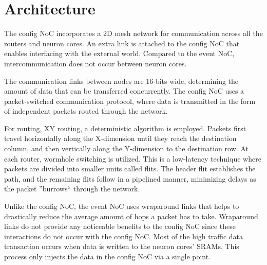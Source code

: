\section{Architecture}
The config NoC incorporates a 2D mesh network for communication across all the routers and neuron cores.
An extra link is attached to the config NoC that enables interfacing with the external world.
Compared to the event NoC, intercommunication does not occur between neuron cores.


The communication links between nodes are 16-bits wide, determining the amount of data that can be transferred concurrently.
The config NoC uses a packet-switched communication protocol, where data is transmitted in the form of independent packets routed through the network.

For routing, XY routing, a deterministic algorithm is employed.
Packets first travel horizontally along the X-dimension until they reach the destination column, and then vertically along the Y-dimension to the destination row.
At each router, wormhole switching is utilized.
This is a low-latency technique where packets are divided into smaller units called flits.
The header flit establishes the path, and the remaining flits follow in a pipelined manner, minimizing delays as the packet ''burrows`` through the network.

Unlike the config NoC, the event NoC uses wraparound links that helps to drastically reduce the average amount of hops a packet has to take.
Wraparound links do not provide any noticeable benefits to the config NoC since these interactions do not occur with the config NoC.
Most of the high traffic data transaction occurs when data is written to the neuron cores' SRAMs.
This process only injects the data in the config NoC via a single point.
